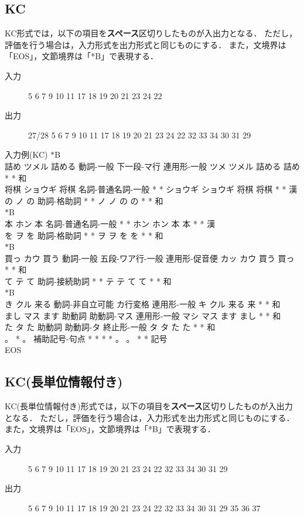 \documentclass[titlepage]{jarticle}
\begin{document}
\subsection{KC}
KC形式では，以下の項目を\textbf{スペース}区切りしたものが入出力となる．
ただし，評価を行う場合は，入力形式を出力形式と同じものにする．
また，文境界は「EOS」，文節境界は「*B」で表現する．
\begin{description}
\item[入力] 5 6 7 9 10 11 17 18 19 20 21 23 24 22
\item[出力] 27/28 5 6 7 9 10 11 17 18 19 20 21 23 24 22 32 33 34 30 31 29
\end{description}
\begin{itembox}[l]{入力例(KC)}
\small
$*$B\\
詰め ツメル 詰める 動詞-一般 下一段-マ行 連用形-一般 ツメ ツメル 詰める 詰め * * 和\\
将棋 ショウギ 将棋 名詞-普通名詞-一般 * * ショウギ ショウギ 将棋 将棋 * * 漢\\
の ノ の 助詞-格助詞 * * ノ ノ の の * * 和\\
$*$B\\
本 ホン 本 名詞-普通名詞-一般 * * ホン ホン 本 本 * * 漢\\
を ヲ を 助詞-格助詞 * * ヲ ヲ を を * * 和\\
$*$B\\
買っ カウ 買う 動詞-一般 五段-ワア行-一般 連用形-促音便 カッ カウ 買う 買っ * * 和\\
て テ て 助詞-接続助詞 * * テ テ て て * * 和\\
$*$B\\
き クル 来る 動詞-非自立可能 カ行変格 連用形-一般 キ クル 来る 来 * * 和\\
まし マス ます 助動詞 助動詞-マス 連用形-一般 マシ マス ます まし * * 和\\
た タ た 助動詞 助動詞-タ 終止形-一般 タ タ た た * * 和\\
。 * 。 補助記号-句点 * * * * 。 。 * * 記号\\
EOS
\end{itembox}



\subsection{KC(長単位情報付き)}
KC(長単位情報付き)形式では，以下の項目を\textbf{スペース}区切りしたものが入出力となる．
ただし，評価を行う場合は，入力形式を出力形式と同じものにする．
また，文境界は「EOS」，文節境界は「*B」で表現する．
\begin{description}
\item[入力] 5 6 7 9 10 11 17 18 19 20 21 23 24 22 32 33 34 30 31 29
\item[出力] 5 6 7 9 10 11 17 18 19 20 21 23 24 22 32 33 34 30 31 29 35 36 37
\end{description}
\end{document}
